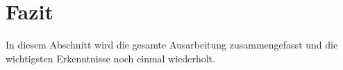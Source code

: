 \section{Fazit}
\label{sec:fazit}
In diesem Abschnitt wird die gesamte Ausarbeitung zusammengefasst und die wichtigsten Erkenntnisse noch einmal wiederholt.
